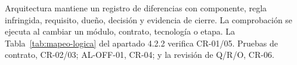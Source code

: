 Arquitectura mantiene un registro de diferencias con componente, regla infringida, requisito, dueño, decisión y evidencia de cierre. La comprobación se ejecuta al cambiar un módulo, contrato, tecnología o etapa. La Tabla~\ref{tab:mapeo-logica} del apartado 4.2.2 verifica CR-01/05. Pruebas de contrato, CR-02/03; AL-OFF-01, CR-04; y la revisión de Q/R/O, CR-06.

\label{fuente-22-anexo-4-1-s-puntos-de-vista-fin}
